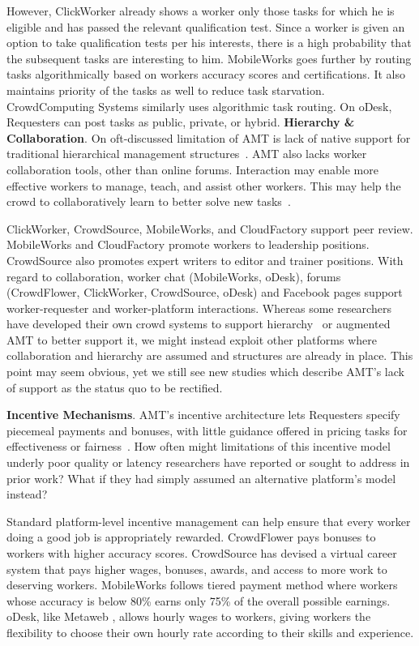 \documentclass{sigchi}
\begin{document}
However, ClickWorker already shows a worker only those tasks for which he is eligible and has passed the relevant qualification test. Since a worker is given an option to take qualification tests per his interests, there is a high probability that the subsequent tasks are interesting to him. MobileWorks goes further by routing tasks algorithmically based on workers accuracy scores and certifications. It also maintains priority of the tasks as well to reduce task starvation. CrowdComputing Systems similarly uses algorithmic task routing. On oDesk, Requesters can post tasks as public, private, or hybrid. 
{\bf Hierarchy \& Collaboration}. On oft-discussed limitation of AMT is lack of native support for traditional hierarchical management structures~\cite{kochhar2010anatomy,Nallapati13}. AMT also lacks worker collaboration tools, other than online forums. 
Interaction may enable more effective workers to manage, teach, and assist other workers. This may help the crowd to collaboratively learn to better solve new tasks~\cite{Kulkarni12}. 

ClickWorker, CrowdSource, MobileWorks, and CloudFactory support peer review. MobileWorks and CloudFactory promote workers to leadership positions. CrowdSource also promotes expert writers to editor and trainer positions. 
With regard to collaboration, worker chat (MobileWorks, oDesk), forums (CrowdFlower, ClickWorker, CrowdSource, oDesk) and Facebook pages support worker-requester and worker-platform interactions. Whereas some researchers have developed their own crowd systems to support hierarchy~\cite{kochhar2010anatomy,Nallapati13} or augmented AMT to better support it, we might instead exploit other platforms where collaboration and hierarchy are assumed and structures are already in place. This point may seem obvious, yet we still see new studies which describe AMT's lack of support as the status quo to be rectified. 





{\bf Incentive Mechanisms}. AMT's incentive architecture lets Requesters specify piecemeal payments and bonuses, with little guidance offered in pricing tasks for effectiveness or fairness~\cite{Mason:Watts:2009,faridani2011s,singer2011pricing}. 
How often might limitations of this incentive model underly poor quality or latency researchers have reported or sought to address in prior work?  What if they had simply assumed an alternative platform's model instead?

Standard platform-level incentive management can help ensure that every worker doing a good job is appropriately rewarded. CrowdFlower pays bonuses to workers with higher accuracy scores. CrowdSource has devised a virtual career system that pays higher wages, bonuses, awards, and access to more work to deserving workers. MobileWorks follows tiered payment method where workers whose accuracy is below 80\%  earns only 75\% of the overall possible earnings. oDesk, like Metaweb \cite{kochhar2010anatomy}, allows hourly wages to workers, giving workers the flexibility to choose their own hourly rate according to their skills and experience.
\end{document}
